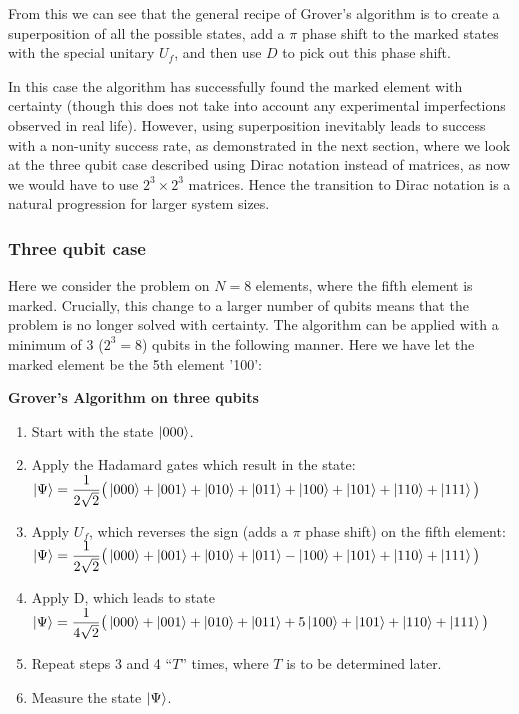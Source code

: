 From this we can see that the general recipe of Grover's algorithm is to create a superposition of all the possible states, add a $\pi$ phase shift to the marked states with the special unitary $U_f$, and then use $D$ to pick out this phase shift.

In this case the algorithm has successfully found the marked element with certainty (though this does not take into account any experimental imperfections observed in real life). However, using superposition inevitably leads to success with a non-unity success rate, as demonstrated in the next section, where we look at the three qubit case described using Dirac notation instead of matrices, as now we would have to use $2^3 \times 2^3$ matrices. Hence the transition to Dirac notation is a natural progression for larger system sizes. 

\subsubsection{Three qubit case}
Here we consider the problem on $N=8$ elements, where the fifth element is marked. Crucially, this change to a larger number of qubits means that the problem is no longer solved with certainty. The algorithm can be applied with a minimum of $3$  ($2^{3}=8$) qubits in the following manner. Here we have let the marked element be the 5th element '100':

\begin{tcolorbox}[standard jigsaw,
    opacityback=0,  %
    boxrule=0.5pt,label={example100100000}]
    {\bf Grover's Algorithm on three qubits}
    \tcbline
    \begin{enumerate}
    \item Start with the state $\left\vert{000}\right\rangle$.
    \item Apply the Hadamard gates which result in the state: $\left\vert{\Psi}\right\rangle=\dfrac{1}{2\sqrt{2}}\big(\left\vert{000}\right\rangle+\left\vert{001}\right\rangle+\left\vert{010}\right\rangle+\left\vert{011}\right\rangle+\left\vert{100}\right\rangle+\left\vert{101}\right\rangle+\left\vert{110}\right\rangle+\left\vert{111}\right\rangle\big)$
    \item Apply $U_{f}$, which reverses the sign (adds a $\pi$ phase shift) on the fifth element: $\left\vert{\Psi}\right\rangle=\dfrac{1}{2\sqrt{2}}\big(\left\vert{000}\right\rangle+\left\vert{001}\right\rangle+\left\vert{010}\right\rangle+\left\vert{011}\right\rangle-\left\vert{100}\right\rangle+\left\vert{101}\right\rangle+\left\vert{110}\right\rangle+\left\vert{111}\right\rangle\big)$
    \item Apply D, which leads to state $\left\vert{\Psi}\right\rangle=\dfrac{1}{4\sqrt{2}}\big(\left\vert{000}\right\rangle+\left\vert{001}\right\rangle+\left\vert{010}\right\rangle+\left\vert{011}\right\rangle+5\left\vert{100}\right\rangle+\left\vert{101}\right\rangle+\left\vert{110}\right\rangle+\left\vert{111}\right\rangle\big)$
    \item Repeat steps 3 and 4 ``$T$'' times, where $T$ is to be determined later.
    \item Measure the state $\left\vert{\Psi}\right\rangle$.
    \end{enumerate}
\end{tcolorbox}



